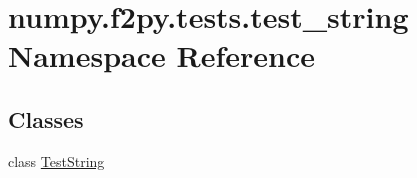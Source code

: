 \hypertarget{namespacenumpy_1_1f2py_1_1tests_1_1test__string}{}\section{numpy.\+f2py.\+tests.\+test\+\_\+string Namespace Reference}
\label{namespacenumpy_1_1f2py_1_1tests_1_1test__string}
\subsection*{Classes}
\begin{DoxyCompactItemize}
\item 
class \hyperlink{classnumpy_1_1f2py_1_1tests_1_1test__string_1_1TestString}{Test\+String}
\end{DoxyCompactItemize}
